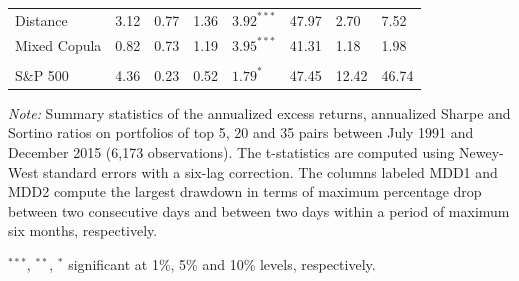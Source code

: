 \documentclass[pdf,10pt,xcolor=dvipsnames,hide notes]{beamer}
\begin{document}
\begin{frame}
\begin{threeparttable}[H]
\begin{tabularx}{\textwidth}{@{\extracolsep{\fill}}llllllll@{}}
				Distance & \cellcolor{celadon} 3.12  & \cellcolor{celadon} 0.77  & 1.36  & $3.92^{***}$  & 47.97 & 2.70  & 7.52 \\
				Mixed Copula & 0.82  & 0.73  & 1.19  & $3.95^{***}$  & 41.31 & \cellcolor{corn} 1.18  & \cellcolor{corn} 1.98  \\
				\multicolumn{1}{r}{} & \multicolumn{1}{r}{} & \multicolumn{1}{r}{} & \multicolumn{1}{r}{} & \multicolumn{1}{r}{} & \multicolumn{1}{r}{} & \multicolumn{1}{r}{} & \multicolumn{1}{r}{} \\
				\midrule
				S\&P 500  & 4.36  & \cellcolor{Melon} 0.23  & 0.52  & $1.79^{*}$  & 47.45 & \cellcolor{Melon} 12.42  & \cellcolor{Melon} 46.74  \\
				\bottomrule
			\end{tabularx}%
			\begin{tablenotes}
				\item \textit{Note:} \scriptsize \tiny Summary statistics of the annualized excess returns, annualized Sharpe and Sortino ratios on portfolios of top 5, 20 and 35 pairs between July 1991 and December 2015 (6,173 observations). The t-statistics are computed using Newey-West standard errors with a six-lag correction. The columns labeled MDD1 and MDD2 compute the largest drawdown in terms of maximum percentage drop between two consecutive days and between two days within a period of maximum six months, respectively.
				\item \scriptsize $^{\ast\ast\ast}$, $^{\ast\ast}$, $^{\ast}$  significant at 1\%, 5\% and 10\% levels, respectively.
			\end{tablenotes}
			\label{tab:table101}%
		\end{threeparttable}%

	\end{frame}
\end{document}
